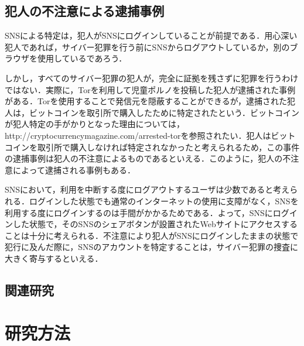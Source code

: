 \documentclass[10pt, a4paper]{jreport}
\begin{document}
\section{犯人の不注意による逮捕事例}
SNSによる特定は，犯人がSNSにログインしていることが前提である．用心深い犯人であれば，サイバー犯罪を行う前にSNSからログアウトしているか，別のブラウザを使用しているであろう．

しかし，すべてのサイバー犯罪の犯人が，完全に証拠を残さずに犯罪を行うわけではない．実際に，Torを利用して児童ポルノを投稿した犯人が逮捕された事例がある．Torを使用することで発信元を隠蔽することができるが，逮捕された犯人は，ビットコインを取引所で購入したために特定されたという\cite{arrest_by_bitcoin}．ビットコインが犯人特定の手がかりとなった理由については，http://cryptocurrencymagazine.com/arrested-torを参照されたい．犯人はビットコインを取引所で購入しなければ特定されなかったと考えられるため，この事件の逮捕事例は犯人の不注意によるものであるといえる．このように，犯人の不注意によって逮捕される事例もある．

SNSにおいて，利用を中断する度にログアウトするユーザは少数であると考えられる．ログインした状態でも通常のインターネットの使用に支障がなく，SNSを利用する度にログインするのは手間がかかるためである．よって，SNSにログインした状態で，そのSNSのシェアボタンが設置されたWebサイトにアクセスすることは十分に考えられる．不注意により犯人がSNSにログインしたままの状態で犯行に及んだ際に，SNSのアカウントを特定することは，サイバー犯罪の捜査に大きく寄与するといえる．

\section{関連研究}














\chapter{研究方法}
\end{document}
